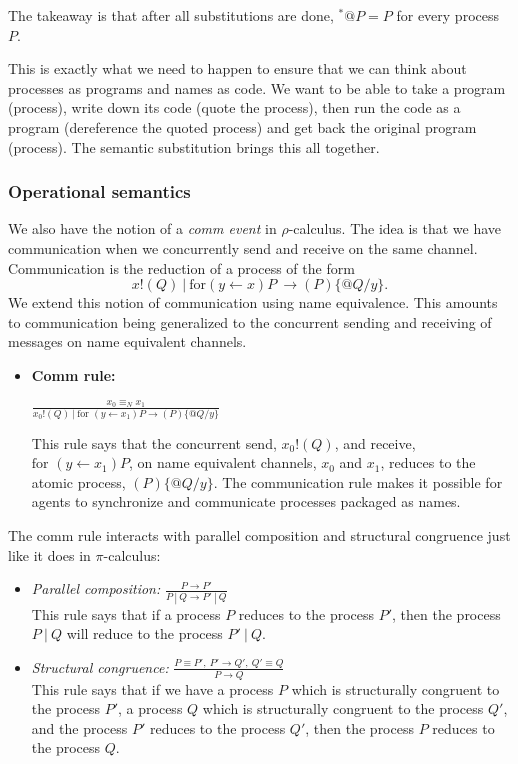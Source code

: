 \documentclass[12pt]{article}
\numberwithin{equation}{section}
\begin{document}
\begin{center}
The takeaway is that after all substitutions are done, ${}^*@P=P$ for every process $P$.
\end{center}

This is exactly what we need to happen to ensure that we can think about processes as programs and names as code. We want to be able to take a program (process), write down its code (quote the process), then run the code as a program (dereference the quoted process) and get back the original program (process). The semantic substitution brings this all together.

\subsubsection{Operational semantics}
We also have the notion of a \emph{comm event} in $\rho$-calculus. The idea is that we have communication when we concurrently send and receive on the same channel. Communication is the reduction of a process of the form
\[ x!(Q) \ | \ \text{for}(y \leftarrow x)P \ \rightarrow (P)\{ @Q / y \}. \]
We extend this notion of communication using name equivalence. This amounts to communication being generalized to the concurrent sending and receiving of messages on name equivalent channels.
\begin{itemize}
\item \textbf{Comm rule:} \begin{center} $\displaystyle \frac{x_0 \equiv_N x_1}{x_0!(Q) \ | \ \text{for }(y \leftarrow x_1)P \rightarrow (P)\{ @Q / y \} }$ \end{center}
This rule says that the concurrent send, $x_0!(Q)$, and receive, $\text{for }(y \leftarrow x_1)P$, on name equivalent channels, $x_0$ and $x_1$, reduces to the atomic process, $(P)\{ @Q / y \}$. The communication rule makes it possible for agents to synchronize and communicate processes packaged as names.
\end{itemize}

The comm rule interacts with parallel composition and structural congruence just like it does in $\pi$-calculus:

\begin{itemize}
\item \emph{Parallel composition:} $\displaystyle \frac{P \rightarrow P'}{P \ | \ Q \rightarrow P' \ | \ Q}$ \\
This rule says that if a process $P$ reduces to the process $P'$, then the process $P \ | \ Q$ will reduce to the process $P' \ | \ Q$.

\item \emph{Structural congruence:} $\displaystyle \frac{P \equiv P', \ P' \rightarrow Q', \ Q' \equiv Q}{P \rightarrow Q}$ \\
This rule says that if we have a process $P$ which is structurally congruent to the process $P'$, a process $Q$ which is structurally congruent to the process $Q'$, and the process $P'$ reduces to the process $Q'$, then the process $P$ reduces to the process $Q$.
\end{itemize}
\end{document}
